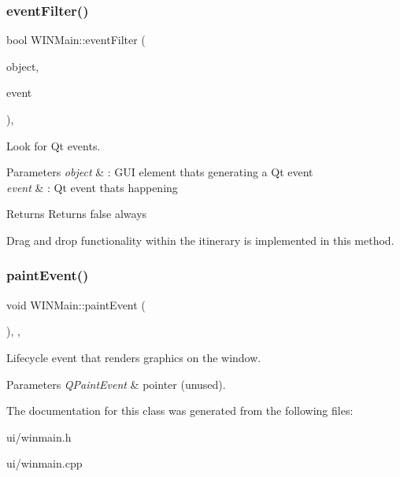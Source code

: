 \subsubsection{\texorpdfstring{eventFilter()}{eventFilter()}}
{\footnotesize\ttfamily bool W\+I\+N\+Main\+::event\+Filter (\begin{DoxyParamCaption}\item[{Q\+Object $\ast$}]{object,  }\item[{Q\+Event $\ast$}]{event }\end{DoxyParamCaption})\hspace{0.3cm}{\ttfamily [override]}, {\ttfamily [protected]}}



Look for Qt events. 


\begin{DoxyParams}{Parameters}
{\em object} & \+: G\+UI element that\textquotesingle{}s generating a Qt event \\
\hline
{\em event} & \+: Qt event that\textquotesingle{}s happening \\
\hline
\end{DoxyParams}
\begin{DoxyReturn}{Returns}
Returns false always
\end{DoxyReturn}
Drag and drop functionality within the itinerary is implemented in this method. \mbox{\label{class_w_i_n_main_a906d327c99d10704adff07b81422052e}} 
\subsubsection{\texorpdfstring{paintEvent()}{paintEvent()}}
{\footnotesize\ttfamily void W\+I\+N\+Main\+::paint\+Event (\begin{DoxyParamCaption}\item[{Q\+Paint\+Event $\ast$}]{ }\end{DoxyParamCaption})\hspace{0.3cm}{\ttfamily [override]}, {\ttfamily [protected]}, {\ttfamily [virtual]}}



Lifecycle event that renders graphics on the window. 


\begin{DoxyParams}{Parameters}
{\em Q\+Paint\+Event} & pointer (unused). \\
\hline
\end{DoxyParams}


The documentation for this class was generated from the following files\+:\begin{DoxyCompactItemize}
\item 
ui/winmain.\+h\item 
ui/winmain.\+cpp\end{DoxyCompactItemize}
